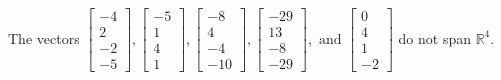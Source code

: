 \begin{exercise}
\begin{exerciseStatement}
  \end{exerciseStatement}
  \begin{exerciseAnswer}
   The vectors \(\left[\begin{array}{r}
-4 \\
2 \\
-2 \\
-5
\end{array}\right] , \left[\begin{array}{r}
-5 \\
1 \\
4 \\
1
\end{array}\right] , \left[\begin{array}{r}
-8 \\
4 \\
-4 \\
-10
\end{array}\right] , \left[\begin{array}{r}
-29 \\
13 \\
-8 \\
-29
\end{array}\right] , \text{ and } \left[\begin{array}{r}
0 \\
4 \\
1 \\
-2
\end{array}\right]\) 
  	 do not  
	span \(\mathbb{R}^4\).
  


  \end{exerciseAnswer}
\end{exercise}